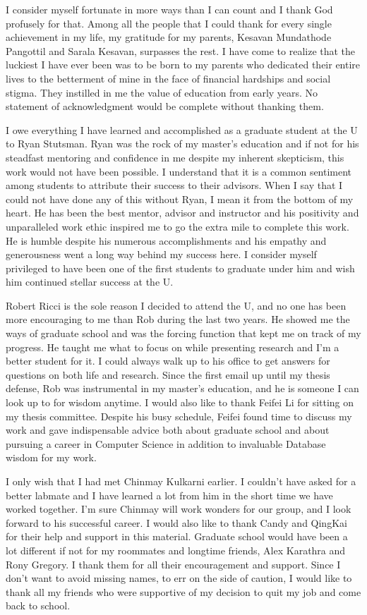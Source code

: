 I consider myself fortunate in more ways than I can count and I thank God profusely for that. Among all the people that I could thank for every single achievement in my life, my gratitude for my parents, Kesavan Mundathode Pangottil
and Sarala Kesavan, surpasses the rest. I have come to realize that the luckiest I have ever been was to be born to my parents who dedicated their entire lives to the betterment of mine in the face of financial hardships and social stigma. They instilled in me the value of education from early years. No statement of acknowledgment would be complete without thanking them.

I owe everything I have learned and accomplished as a graduate student at the U to Ryan Stutsman. Ryan was the rock of my master's education and if not for his steadfast mentoring and confidence in me despite my inherent skepticism, this work would not have been possible.
I understand that it is a common sentiment among students to attribute their success to their advisors. When I say that I could not have done any of this without Ryan, I mean it from the bottom of my heart. He has been the best mentor, advisor and instructor and his positivity and unparalleled work ethic inspired me to go the extra mile to complete this work.
He is humble despite his numerous accomplishments and his empathy and generousness went a long way behind my success here. I consider myself privileged to have been one of the first students to graduate under him and wish him continued stellar success at the U.

Robert Ricci is the sole reason I decided to attend the U, and no one has been more encouraging to me than Rob during the last two years. He showed me the ways of graduate school and
was the forcing function that kept me on track of my progress. He taught me what to focus on while presenting research and I'm a better student for it. I could always walk up to his office to get answers for questions on both life and research. Since the first email up until my thesis defense, Rob was instrumental in my master's education, and he is someone I can look up to for wisdom anytime.
I would also like to thank Feifei Li for sitting on my thesis committee. Despite his busy schedule, Feifei found time to discuss my work and gave indispensable advice both about graduate school and about pursuing a career in Computer Science in addition to invaluable Database wisdom for my work.

I only wish that I had met Chinmay Kulkarni earlier. I couldn't have asked for a better labmate and I have learned a lot from him in the short time we have worked together.
I'm sure Chinmay will work wonders for our group, and I look forward to his successful career. I would also like to thank Candy and QingKai for their help and support in this material.
Graduate school would have been a lot different if not for my roommates and longtime friends, Alex Karathra and Rony Gregory. I thank them for all their encouragement and support.
Since I don't want to avoid missing names, to err on the side of caution, I would like to thank all my friends who were supportive of my decision to quit my job and come back to school.

